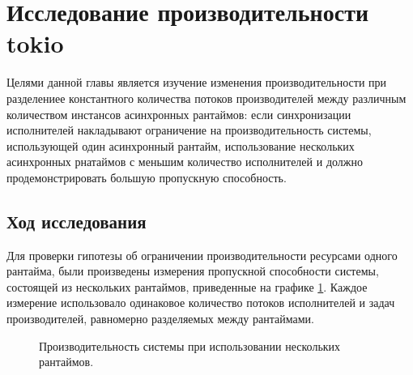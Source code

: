 
\section{Исследование производительности tokio}

Целями данной главы является изучение изменения производительности при разделениее константного количества потоков производителей между различным количеством инстансов асинхронных рантаймов: если синхронизации исполнителей накладывают ограничение на производительность системы, использующей один асинхронный рантайм, использование нескольких асинхронных рнатаймов с меньшим количество исполнителей и должно продемонстрировать большую пропускную способность.

\subsection{Ход исследования}

Для проверки гипотезы об ограничении производительности ресурсами одного рантайма, были произведены измерения пропускной способности системы, состоящей из нескольких рантаймов, приведенные на графике \ref{fig:tatlin:multi_rt:eval}. Каждое измерение использовало одинаковое количество потоков исполнителей и задач производителей, равномерно разделяемых между рантаймами.

\begin{figure}[H]
    \begin{center}
    \end{center}

    \caption{Производительность системы при использовании нескольких рантаймов.}
    \label{fig:tatlin:multi_rt:eval}
\end{figure}

